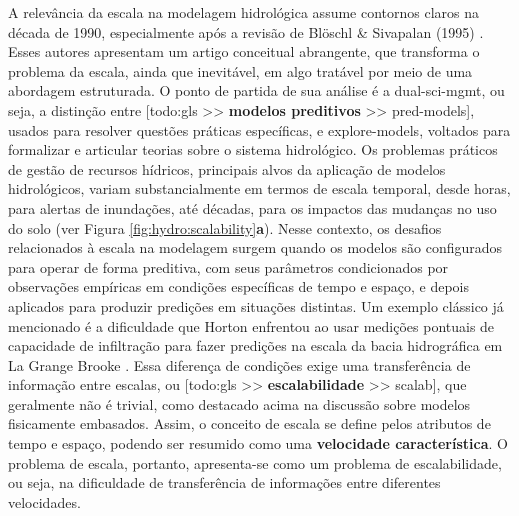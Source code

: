 \documentclass[./main.tex]{subfiles}
\begin{document}
\par A relevância da escala na modelagem hidrológica assume contornos claros na década de 1990, especialmente após a revisão de Blöschl \& Sivapalan (1995) \cite{Bloschl1995a}. Esses autores apresentam um artigo conceitual abrangente, que transforma o problema da escala, ainda que inevitável, em algo tratável por meio de uma abordagem estruturada. O ponto de partida de sua análise é a \gls{dual-sci-mgmt}, ou seja, a distinção entre [todo:gls >> \textbf{modelos preditivos} >> pred-models], usados para resolver questões práticas específicas, e \gls{explore-models}, voltados para formalizar e articular teorias sobre o sistema hidrológico. Os problemas práticos de gestão de recursos hídricos, principais alvos da aplicação de modelos hidrológicos, variam substancialmente em termos de escala temporal, desde horas, para alertas de inundações, até décadas, para os impactos das mudanças no uso do solo (ver Figura \ref{fig:hydro:scalability}\textbf{a}). Nesse contexto, os desafios relacionados à escala na modelagem surgem quando os modelos são configurados para operar de forma preditiva, com seus parâmetros condicionados por observações empíricas em condições específicas de tempo e espaço, e depois aplicados para produzir predições em situações distintas. Um exemplo clássico já mencionado é a dificuldade que Horton enfrentou ao usar medições pontuais de capacidade de infiltração para fazer predições na escala da bacia hidrográfica em La Grange Brooke \cite{Beven2004c}. Essa diferença de condições exige uma transferência de informação entre escalas, ou [todo:gls >> \textbf{escalabilidade} >> scalab], que geralmente não é trivial, como destacado acima na discussão sobre modelos fisicamente embasados. Assim, o conceito de escala se define pelos atributos de tempo e espaço, podendo ser resumido como uma \textbf{velocidade característica}. O problema de escala, portanto, apresenta-se como um problema de escalabilidade, ou seja, na dificuldade de transferência de informações entre diferentes velocidades.
\end{document}

